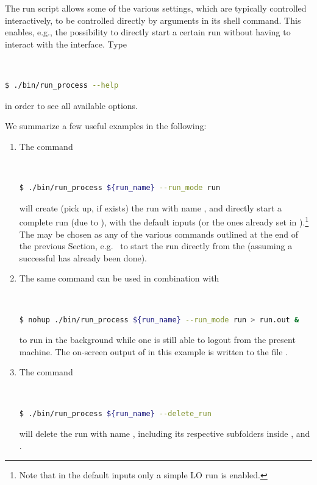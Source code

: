 \documentclass[english,11pt]{article}
\begin{document}
The run script allows some of the various settings, which are typically controlled interactively, 
to be controlled directly by arguments in its shell command. This enables, e.g., the 
possibility to directly start a certain run without having to interact with the interface. Type

\lstset{basicstyle=\small, frame=none}
{\tt
\begin{lstlisting}[language=bash]
 $ ./bin/run_process --help
\end{lstlisting}
}%
in order to see all available options.

We summarize a few useful examples in the following:\\[-0.8cm]
\begin{enumerate}[label={\arabic*.)}]
\item The command
\lstset{basicstyle=\small, frame=none}
{\tt
\begin{lstlisting}[language=bash]
 $ ./bin/run_process ${run_name} --run_mode run
\end{lstlisting}
}%
will create (pick up, if  exists) the run with name , and
directly start a complete run (due to ), with the default inputs
(or the ones already set in ).\footnote{Note that in the default inputs only a simple LO run is enabled.} 
The  may be chosen as any of the various commands outlined at the end of the 
previous Section, e.g.\  to start the run directly from the \premainrun{} (assuming a successful 
\gridrun{} has already been done).
\item The same command can be used in combination with 
\lstset{basicstyle=\small, frame=none}
{\tt
\begin{lstlisting}[language=bash]
 $ nohup ./bin/run_process ${run_name} --run_mode run > run.out &
\end{lstlisting}
}%
to run \Matrix{} in the background while one is still able to logout from the 
present machine. The on-screen output of \Matrix{} in this 
example is written to the file .
\item The command
\lstset{basicstyle=\small, frame=none}
{\tt
\begin{lstlisting}[language=bash]
 $ ./bin/run_process ${run_name} --delete_run
\end{lstlisting}
}%
will delete the run with name , including its respective subfolders inside ,  and .

\end{enumerate}
\end{document}
